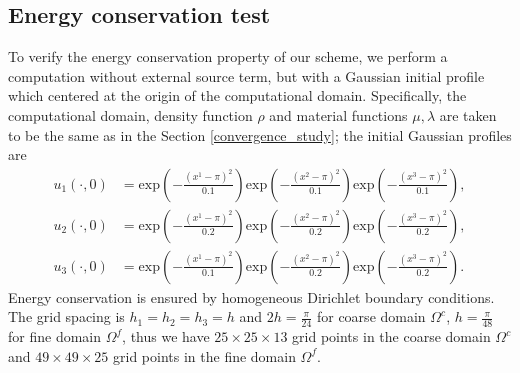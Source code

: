 \subsection{Energy conservation test}\label{conserved_energy}
To verify the energy conservation property of our scheme, we perform a computation without external source term, but with a Gaussian initial profile which centered at the origin of the computational domain.  Specifically, the computational domain, density function $\rho$ and material functions $\mu, \lambda$ are taken to be the same as in the Section \ref{convergence_study}; the initial Gaussian profiles are
\begin{align*}
	u_1(\cdot,0) &= \mbox{exp}\left(-\frac{(x^1-\pi)^2}{0.1}\right)\mbox{exp}\left(-\frac{(x^2-\pi)^2}{0.1}\right)\mbox{exp}\left(-\frac{(x^3-\pi)^2}{0.1}\right),\\
	u_2(\cdot,0) &= \mbox{exp}\left(-\frac{(x^1-\pi)^2}{0.2}\right)\mbox{exp}\left(-\frac{(x^2-\pi)^2}{0.2}\right)\mbox{exp}\left(-\frac{(x^3-\pi)^2}{0.2}\right),\\
	u_3(\cdot,0) &= \mbox{exp}\left(-\frac{(x^1-\pi)^2}{0.1}\right)\mbox{exp}\left(-\frac{(x^2-\pi)^2}{0.2}\right)\mbox{exp}\left(-\frac{(x^3-\pi)^2}{0.2}\right).
\end{align*}
Energy conservation is ensured by homogeneous Dirichlet boundary conditions. The grid spacing is $h_1 = h_2 = h_3 = h$ and $2h = \frac{\pi}{24}$ for coarse domain $\Omega^c$, $h = \frac{\pi}{48}$ for fine domain $\Omega^f$, thus we have $25\times25\times13$ grid points in the coarse domain $\Omega^c$ and $49\times49\times25$ grid points in the fine domain $\Omega^f$. 

